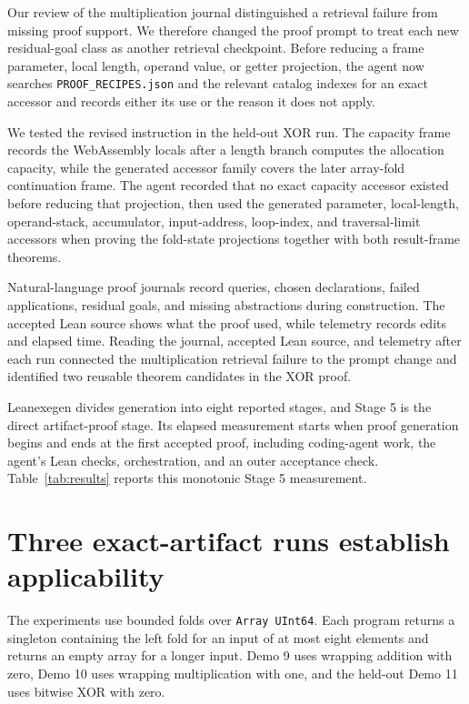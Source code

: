\documentclass[10pt]{article}
\newcommand{\code}[1]{\texttt{#1}}
\begin{document}
Our review of the multiplication journal distinguished a retrieval failure from missing proof support.  We therefore changed the proof prompt to treat each new residual-goal class as another retrieval checkpoint.  Before reducing a frame parameter, local length, operand value, or getter projection, the agent now searches \code{PROOF\_RECIPES.json} and the relevant catalog indexes for an exact accessor and records either its use or the reason it does not apply.

We tested the revised instruction in the held-out XOR run.  The capacity frame records the WebAssembly locals after a length branch computes the allocation capacity, while the generated accessor family covers the later array-fold continuation frame.  The agent recorded that no exact capacity accessor existed before reducing that projection, then used the generated parameter, local-length, operand-stack, accumulator, input-address, loop-index, and traversal-limit accessors when proving the fold-state projections together with both result-frame theorems.

Natural-language proof journals record queries, chosen declarations, failed applications, residual goals, and missing abstractions during construction.  The accepted Lean source shows what the proof used, while telemetry records edits and elapsed time.  Reading the journal, accepted Lean source, and telemetry after each run connected the multiplication retrieval failure to the prompt change and identified two reusable theorem candidates in the XOR proof.

Leanexegen divides generation into eight reported stages, and Stage 5 is the direct artifact-proof stage.  Its elapsed measurement starts when proof generation begins and ends at the first accepted proof, including coding-agent work, the agent's Lean checks, orchestration, and an outer acceptance check.  Table~\ref{tab:results} reports this monotonic Stage 5 measurement.

\section{Three exact-artifact runs establish applicability}

The experiments use bounded folds over \code{Array UInt64}.  Each program returns a singleton containing the left fold for an input of at most eight elements and returns an empty array for a longer input.  Demo 9 uses wrapping addition with zero, Demo 10 uses wrapping multiplication with one, and the held-out Demo 11 uses bitwise XOR with zero.
\end{document}
